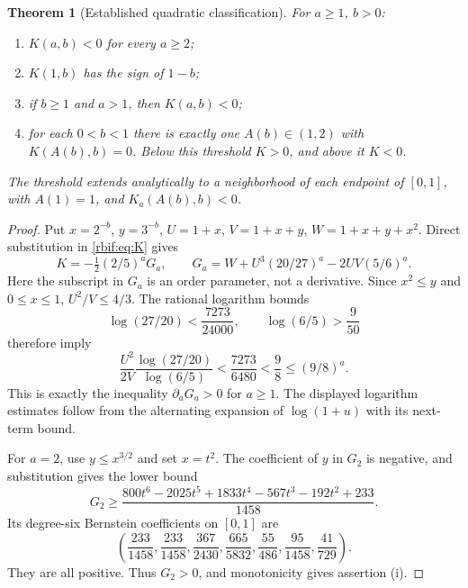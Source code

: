 \documentclass[11pt,a4paper]{article}
\newtheorem{theorem}{Theorem}[section]
\theoremstyle{definition}\newtheorem{definition}[theorem]{Definition}
\theoremstyle{remark}\newtheorem{remark}[theorem]{Remark}
\numberwithin{equation}{section}
\begin{document}
\begin{theorem}[Established quadratic classification]
\label{rbif:thm:quadratic}
For $a\ge1$, $b>0$:
\begin{enumerate}[label=(\roman*)]
\item $K(a,b)<0$ for every $a\ge2$;
\item $K(1,b)$ has the sign of $1-b$;
\item if $b\ge1$ and $a>1$, then $K(a,b)<0$;
\item for each $0<b<1$ there is exactly one $A(b)\in(1,2)$ with
$K(A(b),b)=0$. Below this threshold $K>0$, and above it $K<0$.
\end{enumerate}
The threshold extends analytically to a neighborhood of each endpoint
of $[0,1]$, with $A(1)=1$, and $K_a(A(b),b)<0$.
\end{theorem}
\begin{proof}
Put $x=2^{-b}$, $y=3^{-b}$, $U=1+x$, $V=1+x+y$,
$W=1+x+y+x^2$. Direct substitution in \eqref{rbif:eq:K} gives
\begin{equation}
 K=-\tfrac12(2/5)^a G_a,\qquad
 G_a=W+U^3(20/27)^a-2UV(5/6)^a.
 \label{rbif:eq:Ga}
\end{equation}
Here the subscript in $G_a$ is an order parameter, not a derivative.
Since $x^2\le y$ and $0\le x\le1$,
$U^2/V\le4/3$. The rational logarithm bounds
\[
 \log(27/20)<\frac{7273}{24000},\qquad
 \log(6/5)>\frac9{50}
\]
therefore imply
\[
 \frac{U^2}{2V}\frac{\log(27/20)}{\log(6/5)}
 <\frac{7273}{6480}<\frac98\le(9/8)^a.
\]
This is exactly the inequality $\partial_aG_a>0$ for $a\ge1$.
The displayed logarithm estimates follow from the alternating expansion
of $\log(1+u)$ with its next-term bound.

For $a=2$, use $y\le x^{3/2}$ and set $x=t^2$. The coefficient of $y$
in $G_2$ is negative, and substitution gives the lower bound
\[
 G_2\ge\frac{800t^6-2025t^5+1833t^4-567t^3-192t^2+233}{1458}.
\]
Its degree-six Bernstein coefficients on $[0,1]$ are
\[
 \left(\frac{233}{1458},\frac{233}{1458},\frac{367}{2430},
 \frac{665}{5832},\frac{55}{486},\frac{95}{1458},\frac{41}{729}\right).
\]
They are all positive. Thus $G_2>0$, and monotonicity gives assertion (i).


\end{proof}
\end{document}
